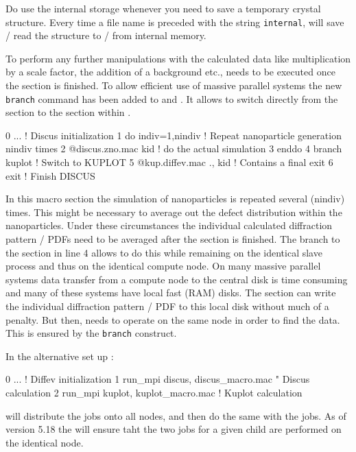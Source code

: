 Do use the internal storage whenever you need to save a temporary crystal 
structure. Every time a file name is preceded with the string {\tt internal},
\Discus will save / read the structure to / from internal memory.

To perform any further manipulations with the calculated data like 
multiplication by a scale factor, the addition of a background etc., \Kuplot
needs to be executed once the \Discus section is finished. To allow
efficient use of massive parallel systems the new {\tt branch} command has 
been added to \Discus and \kuplot. It allows to switch directly from the
\Discus section to the \Kuplot section within \suite. 

\begin{MacVerbatim}
0   ...                        ! Discus initialization
1   do indiv=1,nindiv          ! Repeat nanoparticle generation nindiv times
2      @discus.zno.mac kid     ! do the actual simulation
3   enddo
4   branch   kuplot            ! Switch to KUPLOT
5      @kup.diffev.mac ., kid  ! Contains a final exit
6   exit                       ! Finish DISCUS
\end{MacVerbatim}

In this \Discus macro section the simulation of nanoparticles is repeated
several (nindiv) times. This might be necessary to average out the defect
distribution within the nanoparticles. Under these circumstances the individual
calculated diffraction pattern / PDFs need to be averaged after the \Discus 
section is finished. The branch to the \Kuplot section in line 4 allows
\Discus to do this while remaining on the identical slave process and thus 
on the identical compute node. On many massive parallel systems data transfer 
from a compute node to the central disk is time consuming and many of these 
systems have local fast (RAM) disks. The \Discus section can write the 
individual diffraction pattern / PDF to this local disk without much of a
penalty. But then, \Kuplot needs to operate on the same node in order to 
find the data. This is ensured by the {\tt branch} construct. 

In the alternative set up :
\begin{MacVerbatim}
0   ...                         ! Diffev initialization
1   run\_mpi discus, discus\_macro.mac  " Discus calculation
2   run\_mpi kuplot, kuplot\_macro.mac  ! Kuplot calculation
\end{MacVerbatim}

\Diffev will distribute the \Discus jobs onto all nodes, and then do 
the same with the \Kuplot jobs. As of version 5.18 the \Suite will ensure
taht 
the two jobs for a given child are performed on the identical node. 

